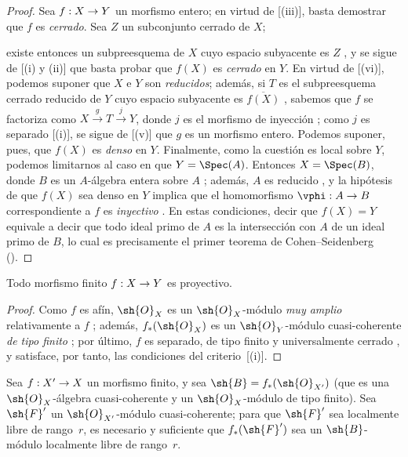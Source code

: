\documentclass[oneside,10pt]{amsart}
\makeatletter
\newcommand{\ega@arrow}[2]{\mathchoice{#1}{#2}{#2}{#2}}
\renewcommand{\to}{\ega@arrow{\longrightarrow}{\rightarrow}}
\newcommand{\oldpage}[2][]{\marginnote{\normalfont\footnotesize\textbf{#1}~|~#2}\ignorespaces}
\let\EGAOriginalLabel\label
\renewcommand{\label}[1]{\phantomsection\EGAOriginalLabel{#1}}
\makeatother
\begin{document}
\begin{proof}
Sea $f:X\to Y$ un morfismo entero;
en virtud de [(iii)], basta demostrar que $f$ es \emph{cerrado}.
Sea $Z$ un subconjunto cerrado de $X$;

\oldpage[II]{113}
existe entonces un subpreesquema de $X$ cuyo espacio subyacente es $Z$ , y se sigue de [(i) y (ii)] que basta probar que $f(X)$ es \emph{cerrado} en $Y$.
En virtud de [(vi)], podemos suponer que $X$ e $Y$ son \emph{reducidos};
además, si $T$ es el subpreesquema cerrado reducido de $Y$ cuyo espacio subyacente es $\overline{f(X)}$ , sabemos que $f$ se factoriza como $X\xrightarrow{g}T\xrightarrow{j}Y$, donde $j$ es el morfismo de inyección ; como $j$ es separado [(i)], se sigue de [(v)] que $g$ es un morfismo entero.
Podemos suponer, pues, que $f(X)$ es \emph{denso} en $Y$.
Finalmente, como la cuestión es local sobre $Y$, podemos limitarnos al caso en que $Y=\Spec(A)$.
Entonces $X=\Spec(B)$, donde $B$ es un $A$-álgebra entera sobre $A$ ;
además, $A$ es reducido , y la hipótesis de que $f(X)$ sea denso en $Y$ implica que el homomorfismo $\vphi:A\to B$ correspondiente a $f$ es \emph{inyectivo} .
En estas condiciones, decir que $f(X)=Y$ equivale a decir que todo ideal primo de $A$ es la intersección con $A$ de un ideal primo de $B$, lo cual es precisamente el primer teorema de Cohen--Seidenberg (\cite[t.~I, p.~257, th.~3]{I-13}).
\end{proof}

\begin{corollary}[6.1.11]
\label{II.6.1.11}
Todo morfismo finito $f:X\to Y$ es proyectivo.
\end{corollary}

\begin{proof}
Como $f$ es afín, $\sh{O}_X$ es un $\sh{O}_X$-módulo \emph{muy amplio} relativamente a $f$ ;
además, $f_*(\sh{O}_X)$ es un $\sh{O}_Y$-módulo cuasi-coherente \emph{de tipo finito} ;
por último, $f$ es separado, de tipo finito y universalmente cerrado , y satisface, por tanto, las condiciones del criterio~[(i)].
\end{proof}

\begin{proposition}[6.1.12]
\label{II.6.1.12}
Sea $f:X'\to X$ un morfismo finito, y sea $\sh{B}=f_*(\sh{O}_{X'})$ (que es una $\sh{O}_X$-álgebra cuasi-coherente y un $\sh{O}_X$-módulo de tipo finito).
Sea $\sh{F}'$ un $\sh{O}_{X'}$-módulo cuasi-coherente;
para que $\sh{F}'$ sea localmente libre de rango~$r$, es necesario y suficiente que $f_*(\sh{F}')$ sea un $\sh{B}$-módulo localmente libre de rango~$r$.
\end{proposition}
\end{document}
